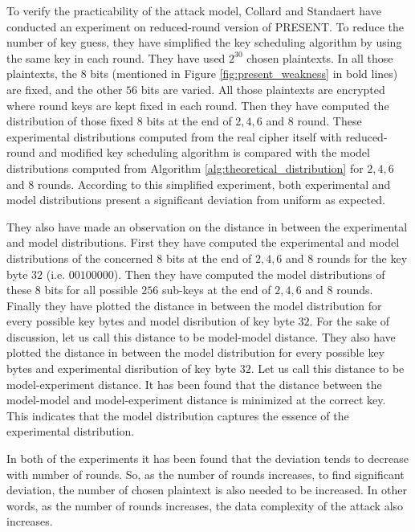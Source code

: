 \par \noindent To verify the practicability of the attack model, Collard and Standaert have conducted an experiment on reduced-round version of PRESENT. To reduce the number of key guess, they have simplified the key scheduling algorithm by using the same key in each round. They have used $2^{30}$ chosen plaintexts. In all those plaintexts, the $8$ bits (mentioned in Figure \ref{fig:present_weakness} in bold lines) are fixed, and the other $56$ bits are varied. All those plaintexts are encrypted where round keys are kept fixed in each round. Then they have computed the distribution of those fixed $8$ bits at the end of $2,4,6$ and $8$ round. These experimental distributions computed from the real cipher itself with reduced-round and modified key scheduling algorithm is compared with the model distributions computed from Algorithm \ref{alg:theoretical_distribution} for $2,4,6$ and $8$ rounds. According to this simplified experiment, both experimental and model distributions present a significant deviation from uniform as expected. \par \noindent They also have made an observation on the distance in between the experimental and model distributions. First they have computed the experimental and model distributions of the concerned $8$ bits at the end of $2,4,6$ and $8$ rounds for the key byte $32$ (i.e. $00100000$). Then they have computed the model distributions of these $8$ bits for all possible $256$ sub-keys at the end of $2,4,6$ and $8$ rounds. Finally they have plotted the distance in between the model distribution for every possible key bytes and model disribution of key byte $32$. For the sake of discussion, let us call this distance to be model-model distance. They also have plotted the distance in between the model distribution for every possible key bytes and experimental disribution of key byte $32$. Let us call this distance to be model-experiment distance. It has been found that the distance between the model-model and model-experiment distance is minimized at the correct key. This indicates that the model distribution captures the essence of the experimental distribution. \par \noindent In both of the experiments it has been found that the deviation tends to decrease with number of rounds. So, as the number of rounds increases, to find significant deviation, the number of chosen plaintext is also needed to be increased. In other words, as the number of rounds increases, the data complexity of the attack also increases.
